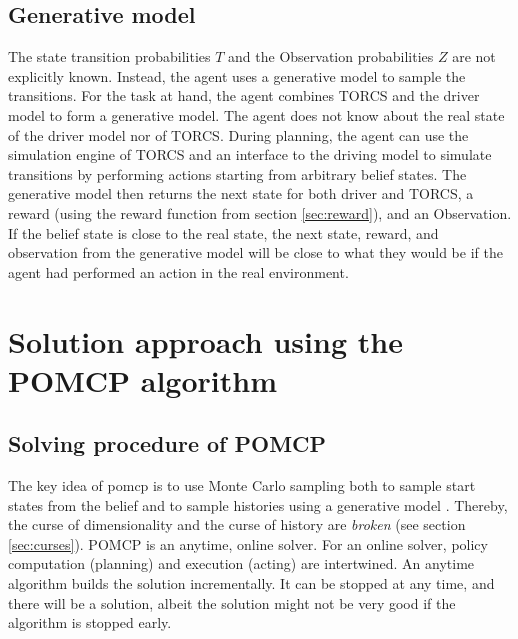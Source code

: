 \subsection{Generative model}
\label{sec:gen_model}

The state transition probabilities $T$ and the Observation probabilities $Z$ are not explicitly known. Instead, the agent uses a generative model to sample the transitions. For the task at hand, the agent combines TORCS and the driver model to form a generative model. The agent does not know about the real state of the driver model nor of TORCS. During planning, the agent can use the simulation engine of TORCS and an interface to the driving model to simulate transitions by performing actions starting from arbitrary belief states. The generative model then returns the next state for both driver and TORCS, a reward (using the reward function from section \ref{sec:reward}), and an Observation. If the belief state is close to the real state, the next state, reward, and observation from the generative model will be close to what they would be if the agent had performed an action in the real environment.

\section{Solution approach using the POMCP algorithm}

\subsection{Solving procedure of POMCP}
\label{sec:pomcp}

The key idea of \acrfull{pomcp} is to use Monte Carlo sampling both to sample start states from the belief and to sample histories using a generative model \parencite{pomcp}. Thereby, the curse of dimensionality and the curse of history are \emph{broken} (see section \ref{sec:curses}). POMCP is an anytime, online solver. For an online solver, policy computation (planning) and execution (acting) are intertwined. An anytime algorithm builds the solution incrementally. It can be stopped at any time, and there will be a solution, albeit the solution might not be very good if the algorithm is stopped early.

